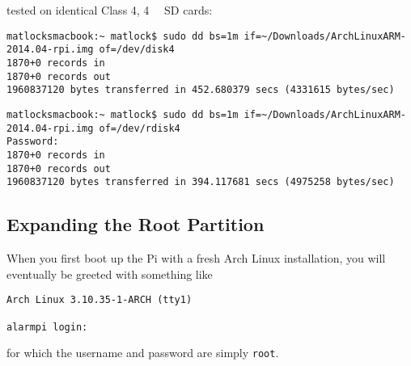 \documentclass[12pt,letterpaper]{article}
\begin{document}
\begin{enumerate}
tested on identical Class 4, \SI{4}{\giga\byte} SD cards:
\begin{lstlisting}
matlocksmacbook:~ matlock$ sudo dd bs=1m if=~/Downloads/ArchLinuxARM-2014.04-rpi.img of=/dev/disk4
1870+0 records in
1870+0 records out
1960837120 bytes transferred in 452.680379 secs (4331615 bytes/sec)
\end{lstlisting}

\begin{lstlisting}
matlocksmacbook:~ matlock$ sudo dd bs=1m if=~/Downloads/ArchLinuxARM-2014.04-rpi.img of=/dev/rdisk4
Password:
1870+0 records in
1870+0 records out
1960837120 bytes transferred in 394.117681 secs (4975258 bytes/sec)
\end{lstlisting}

\end{enumerate}


\subsection{Expanding the Root Partition}

When you first boot up the Pi with a fresh Arch Linux installation, you will eventually be greeted with something like

\begin{lstlisting}
Arch Linux 3.10.35-1-ARCH (tty1)

alarmpi login:
\end{lstlisting}
for which the username and password are simply \lstinline{root}.
\end{document}
